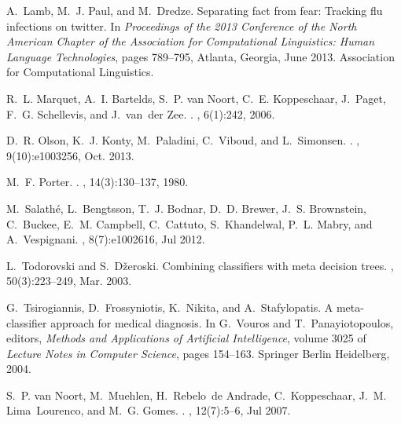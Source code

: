 \documentclass{acm_proc_article-sp}
\begin{document}
\begin{thebibliography}{10}
A.~Lamb, M.~J. Paul, and M.~Dredze.
\newblock Separating fact from fear: Tracking flu infections on twitter.
\newblock In {\em Proceedings of the 2013 Conference of the North American
  Chapter of the Association for Computational Linguistics: Human Language
  Technologies}, pages 789--795, Atlanta, Georgia, June 2013. Association for
  Computational Linguistics.

R.~L. Marquet, A.~I. Bartelds, S.~P. van Noort, C.~E. Koppeschaar, J.~Paget,
  F.~G. Schellevis, and J.~van~der Zee.
.
, 6(1):242, 2006.

D.~R. Olson, K.~J. Konty, M.~Paladini, C.~Viboud, and L.~Simonsen.
.
, 9(10):e1003256, Oct. 2013.

M.~F. Porter.
.
,
  14(3):130--137, 1980.

M.~Salath{\'e}, L.~Bengtsson, T.~J. Bodnar, D.~D. Brewer, J.~S. Brownstein,
  C.~Buckee, E.~M. Campbell, C.~Cattuto, S.~Khandelwal, P.~L. Mabry, and
  A.~Vespignani.
, 8(7):e1002616, Jul 2012.

L.~Todorovski and S.~D\v{z}eroski.
\newblock Combining classifiers with meta decision trees.
, 50(3):223--249, Mar. 2003.

G.~Tsirogiannis, D.~Frossyniotis, K.~Nikita, and A.~Stafylopatis.
\newblock A meta-classifier approach for medical diagnosis.
\newblock In G.~Vouros and T.~Panayiotopoulos, editors, {\em Methods and
  Applications of Artificial Intelligence}, volume 3025 of {\em Lecture Notes
  in Computer Science}, pages 154--163. Springer Berlin Heidelberg, 2004.

S.~P. van Noort, M.~Muehlen, H.~Rebelo~de Andrade, C.~Koppeschaar, J.~M.
  Lima~Lourenco, and M.~G. Gomes.
.
, 12(7):5--6, Jul 2007.

\end{thebibliography}
%
%
%
%
\end{document}
